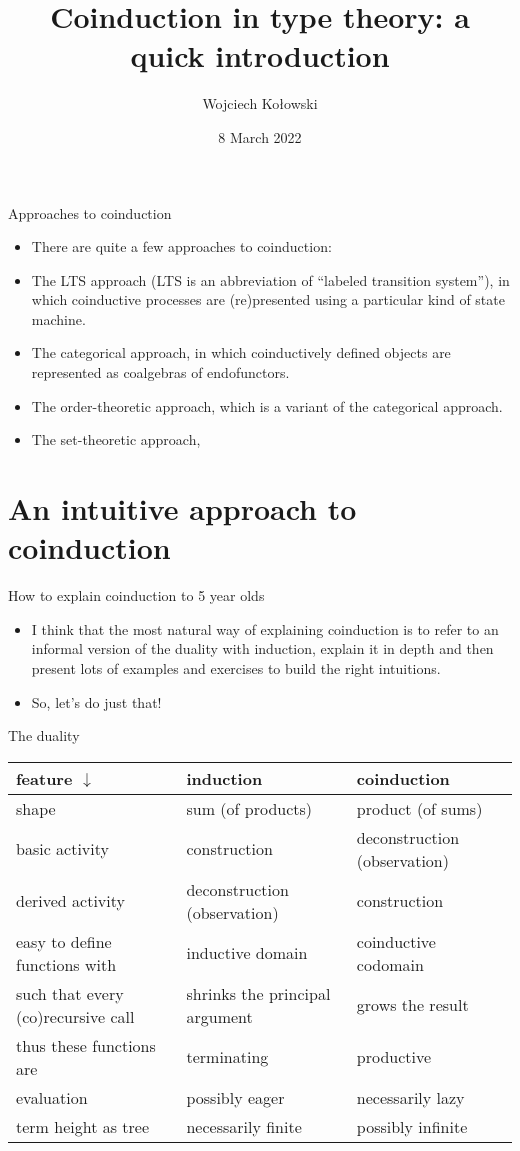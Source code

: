 \documentclass{beamer}
\title{Coinduction in type theory: a quick introduction}
\author{Wojciech Kołowski}
\date{8 March 2022}
\begin{document}
\frame{\titlepage}
\frame{\tableofcontents}

\begin{frame}{Approaches to coinduction}
\begin{itemize}
	\item There are quite a few approaches to coinduction:
	\item The LTS approach (LTS is an abbreviation of ``labeled transition system''), in which coinductive processes are (re)presented using a particular kind of state machine.
	\item The categorical approach, in which coinductively defined objects are represented as coalgebras of endofunctors.
	\item The order-theoretic approach, which is a variant of the categorical approach.
	\item The set-theoretic approach, 
\end{itemize}
\end{frame}

\section{An intuitive approach to coinduction}

\begin{frame}{How to explain coinduction to 5 year olds}
\begin{itemize}
	\item I think that the most natural way of explaining coinduction is to refer to an informal version of the duality with induction, explain it in depth and then present lots of examples and exercises to build the right intuitions.
	\item So, let's do just that! 
\end{itemize}
\end{frame}

\begin{frame}{The duality}
\begin{tabular}{ | p{3cm} | p{3cm} | p{3cm} | }
	\hline
	feature $\downarrow$ & induction & coinduction \\\hline
	shape & sum (of products) & product (of sums) \\\hline
	basic activity & construction & deconstruction (observation) \\\hline
	derived activity & deconstruction (observation) & construction \\\hline
	easy to define functions with & inductive domain & coinductive codomain \\\hline
	such that every (co)recursive call & shrinks the principal argument & grows the result \\\hline
	thus these functions are & terminating & productive \\\hline
	evaluation & possibly eager & necessarily lazy \\\hline
	term height as tree & necessarily finite & possibly infinite \\\hline
\end{tabular}
\end{frame}
\end{document}
